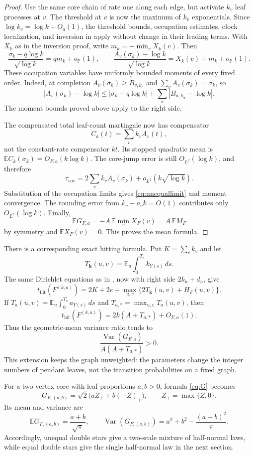 \documentclass[11pt]{amsart}
\theoremstyle{remark}
\numberwithin{equation}{section}
\DeclareMathOperator{\Var}{Var}
\newcommand{\E}{\mathbb{E}}
\newcommand{\Prob}{\mathbb{P}}
\newcommand{\thit}{t_{\mathrm{hit}}}
\newcommand{\taucov}{\tau_{\mathrm{cov}}}
\begin{document}
\begin{proof}
Use the same core chain of rate one along each edge, but activate $k_v$ leaf processes at $v$. The threshold at $v$ is now the maximum of $k_v$ exponentials. Since $\log k_v=\log k+O_a(1)$, the threshold bounds, occupation estimates, clock localization, and inversion in  apply without change in their leading terms. With $X_k$ as in the inversion proof, write $m_k=-\min_vX_k(v)$. Then
\[
\frac{\sigma_k-q\log k}{\sqrt{\log k}}=qm_k+o_{\Prob}(1),\qquad \frac{A_v(\sigma_k)-\log k}{\sqrt{\log k}}=X_k(v)+m_k+o_{\Prob}(1).
\]
These occupation variables have uniformly bounded moments of every fixed order. Indeed, at completion $A_v(\sigma_k)\ge B_{v,k_v}$ and $\sum_vA_v(\sigma_k)=\sigma_k$, so
\[
|A_v(\sigma_k)-\log k|\le|\sigma_k-q\log k|+\sum_u|B_{u,k_u}-\log k|.
\]
The moment bounds proved above apply to the right side.

The compensated total leaf-count martingale now has compensator
\[
C_k(t)=\sum_vk_vA_v(t),
\]
not the constant-rate compensator $kt$. Its stopped quadratic mean is $\E C_k(\sigma_k)=O_{F,a}(k\log k)$. The core-jump error is still $O_{L^2}(\log k)$, and therefore
\[
\taucov=2\sum_vk_vA_v(\sigma_k)+o_{L^2}(k\sqrt{\log k}).
\]
Substitution of the occupation limits gives \eqref{eq:unequallimit} and moment convergence. The rounding error from $k_v-a_vk=O(1)$ contributes only $O_{L^2}(\log k)$. Finally,
\[
\E G_{F,a}=-A\,\E\min_vX_F(v)=A\,\E M_F
\]
by symmetry and $\E X_F(v)=0$. This proves the mean formula.
\end{proof}

There is a corresponding exact hitting formula. Put $K=\sum_vk_v$ and let
\[
T_{\mathbf k}(u,v)=\E_u\int_0^{T_v}k_{Y(s)}\,ds.
\]
The same Dirichlet equations as in , now with right side $2k_u+d_u$, give
\begin{equation}\label{eq:unequalhit}
\thit(F^{(k,a)})=2K+2e+\max_{u,v}\{2T_{\mathbf k}(u,v)+H_F(u,v)\}.
\end{equation}
If $T_a(u,v)=\E_u\int_0^{T_v}a_{Y(s)}\,ds$ and $T_{a,*}=\max_{u,v}T_a(u,v)$, then
\[
\thit(F^{(k,a)})=2k(A+T_{a,*})+O_{F,a}(1).
\]
Thus the geometric-mean variance ratio tends to
\[
\frac{\Var(G_{F,a})}{A(A+T_{a,*})}>0.
\]
This extension keeps the graph unweighted: the parameters change the integer numbers of pendant leaves, not the transition probabilities on a fixed graph.

For a two-vertex core with leaf proportions $a,b>0$, formula \eqref{eq:G} becomes
\[
G_{F,(a,b)}=\sqrt2\big(aZ_++b(-Z)_+\big),\qquad Z_+=\max\{Z,0\}.
\]
Its mean and variance are
\[
\E G_{F,(a,b)}=\frac{a+b}{\sqrt\pi},\qquad \Var(G_{F,(a,b)})=a^2+b^2-\frac{(a+b)^2}{\pi}.
\]
Accordingly, unequal double stars give a two-scale mixture of half-normal laws, while equal double stars give the single half-normal law in the next section.
\end{document}

